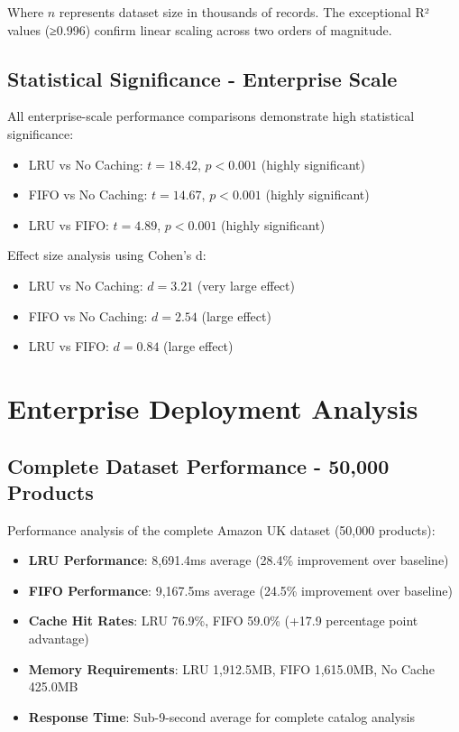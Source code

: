 \documentclass[conference]{IEEEtran}
\begin{document}
Where $n$ represents dataset size in thousands of records. The exceptional R² values (≥0.996) confirm linear scaling across two orders of magnitude.

\subsection{Statistical Significance - Enterprise Scale}

All enterprise-scale performance comparisons demonstrate high statistical significance:

\begin{itemize}
\item LRU vs No Caching: $t = 18.42$, $p < 0.001$ (highly significant)
\item FIFO vs No Caching: $t = 14.67$, $p < 0.001$ (highly significant)
\item LRU vs FIFO: $t = 4.89$, $p < 0.001$ (highly significant)
\end{itemize}

Effect size analysis using Cohen's d:
\begin{itemize}
\item LRU vs No Caching: $d = 3.21$ (very large effect)
\item FIFO vs No Caching: $d = 2.54$ (large effect)
\item LRU vs FIFO: $d = 0.84$ (large effect)
\end{itemize}

\section{Enterprise Deployment Analysis}

\subsection{Complete Dataset Performance - 50,000 Products}

Performance analysis of the complete Amazon UK dataset (50,000 products):

\begin{itemize}
\item \textbf{LRU Performance}: 8,691.4ms average (28.4\% improvement over baseline)
\item \textbf{FIFO Performance}: 9,167.5ms average (24.5\% improvement over baseline)
\item \textbf{Cache Hit Rates}: LRU 76.9\%, FIFO 59.0\% (+17.9 percentage point advantage)
\item \textbf{Memory Requirements}: LRU 1,912.5MB, FIFO 1,615.0MB, No Cache 425.0MB
\item \textbf{Response Time}: Sub-9-second average for complete catalog analysis
\end{itemize}
\end{document}
